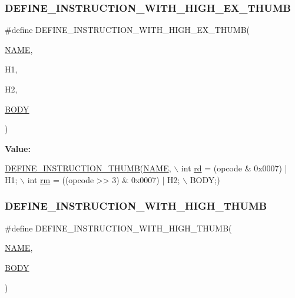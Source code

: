 \subsubsection{\texorpdfstring{D\+E\+F\+I\+N\+E\+\_\+\+I\+N\+S\+T\+R\+U\+C\+T\+I\+O\+N\+\_\+\+W\+I\+T\+H\+\_\+\+H\+I\+G\+H\+\_\+\+E\+X\+\_\+\+T\+H\+U\+MB}{DEFINE\_INSTRUCTION\_WITH\_HIGH\_EX\_THUMB}}
{\footnotesize\ttfamily \#define D\+E\+F\+I\+N\+E\+\_\+\+I\+N\+S\+T\+R\+U\+C\+T\+I\+O\+N\+\_\+\+W\+I\+T\+H\+\_\+\+H\+I\+G\+H\+\_\+\+E\+X\+\_\+\+T\+H\+U\+MB(\begin{DoxyParamCaption}\item[{}]{\mbox{\hyperlink{inflate_8h_a164ea0159d5f0b5f12a646f25f99eceaa67bc2ced260a8e43805d2480a785d312}{N\+A\+ME}},  }\item[{}]{H1,  }\item[{}]{H2,  }\item[{}]{\mbox{\hyperlink{gzlog_8c_aa6bdf6a6d9916c343e1e17774d84a156}{B\+O\+DY}} }\end{DoxyParamCaption})}

{\bfseries Value\+:}
\begin{DoxyCode}
\mbox{\hyperlink{isa-thumb_8c_aca0a4c9b536fe9f14f89105945cfeb3d}{DEFINE\_INSTRUCTION\_THUMB}}(\mbox{\hyperlink{inflate_8h_a164ea0159d5f0b5f12a646f25f99eceaa67bc2ced260a8e43805d2480a785d312}{NAME}}, \(\backslash\)
        \textcolor{keywordtype}{int} \mbox{\hyperlink{isa-arm_8c_a555541ce18ed9b5fad657a06b22cb465}{rd}} = (opcode & 0x0007) | H1; \(\backslash\)
        int \mbox{\hyperlink{isa-thumb_8c_a20e40d2fb8c51fa4dd2b4449ad32e111}{rm}} = ((opcode >> 3) & 0x0007) | H2; \(\backslash\)
        BODY;)
\end{DoxyCode}
\mbox{\label{isa-thumb_8c_a9a6bceac0b85e7d13a8555e219406827}} 
\subsubsection{\texorpdfstring{D\+E\+F\+I\+N\+E\+\_\+\+I\+N\+S\+T\+R\+U\+C\+T\+I\+O\+N\+\_\+\+W\+I\+T\+H\+\_\+\+H\+I\+G\+H\+\_\+\+T\+H\+U\+MB}{DEFINE\_INSTRUCTION\_WITH\_HIGH\_THUMB}}
{\footnotesize\ttfamily \#define D\+E\+F\+I\+N\+E\+\_\+\+I\+N\+S\+T\+R\+U\+C\+T\+I\+O\+N\+\_\+\+W\+I\+T\+H\+\_\+\+H\+I\+G\+H\+\_\+\+T\+H\+U\+MB(\begin{DoxyParamCaption}\item[{}]{\mbox{\hyperlink{inflate_8h_a164ea0159d5f0b5f12a646f25f99eceaa67bc2ced260a8e43805d2480a785d312}{N\+A\+ME}},  }\item[{}]{\mbox{\hyperlink{gzlog_8c_aa6bdf6a6d9916c343e1e17774d84a156}{B\+O\+DY}} }\end{DoxyParamCaption})}

